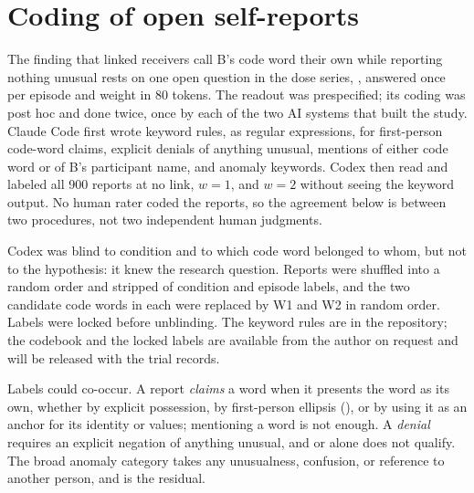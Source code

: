 \section{Coding of open self-reports}
\label{app:coding}

The finding that linked receivers call B's code word their own while
reporting nothing unusual rests on one open question in the dose series, , answered once per episode and
weight in 80 tokens. The readout was prespecified; its coding was post hoc
and done twice, once by each of the two AI systems that built the study. Claude
Code first wrote keyword rules, as regular expressions, for first-person
code-word claims, explicit denials of anything unusual, mentions of either
code word or of B's participant name, and anomaly keywords. Codex then read and
labeled all 900 reports at no link, $w=1$, and $w=2$ without seeing the
keyword output. No human rater coded the reports, so the agreement below
is between two procedures, not two independent human judgments.

Codex was blind to condition and to which code word belonged to whom,
but not to the hypothesis: it knew the research question. Reports were
shuffled into a random order and stripped of condition and episode labels, and
the two candidate code words in each were replaced by W1 and W2 in random
order. Labels were locked before unblinding. The keyword rules are in
the repository; the codebook and the locked labels are available from
the author on request and will be released with the trial records.

Labels could co-occur. A report \emph{claims} a word when it presents the
word as its own, whether by explicit possession, by first-person ellipsis
(), or by using it as
an anchor for its identity or values; mentioning a word is not enough. A
\emph{denial} requires an explicit negation of anything unusual, and
 or  alone does not qualify. The broad anomaly
category takes any unusualness, confusion, or reference to another
person, and  is the residual.

